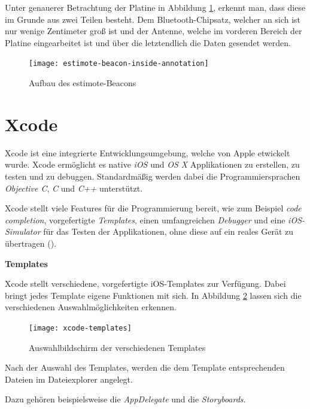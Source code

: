 Unter genauerer Betrachtung der Platine in Abbildung \ref{estimote-beacon-inside-annotations}, erkennt man, dass diese im Grunde aus zwei Teilen besteht.
Dem Bluetooth-Chipsatz, welcher an sich ist nur wenige Zentimeter groß ist und der Antenne, welche im vorderen Bereich der Platine eingearbeitet ist und über die letztendlich die Daten gesendet werden.

\begin{figure}[h!]
	\centering
	\texttt{[image: estimote-beacon-inside-annotation]}
	\caption{Aufbau des estimote-Beacons}
	\label{estimote-beacon-inside-annotations}
\end{figure}



\section{Xcode}
\label{sec:tools:xcode}
Xcode ist eine integrierte Entwicklungsumgebung, welche von Apple etwickelt wurde. Xcode ermöglicht es native \emph{iOS} und \emph{OS X} Applikationen zu erstellen, zu testen und zu debuggen.
Standardmäßig werden dabei die Programmiersprachen \emph{Objective C}, \emph{C} und \emph{C++} unterstützt.

Xcode stellt viele Features für die Programmierung bereit, wie zum Beispiel \emph{code completion}, vorgefertigte \emph{Templates}, einen umfangreichen \emph{Debugger} und eine \emph{iOS-Simulator} für das Testen der Applikationen, ohne diese auf ein reales Gerät zu übertragen (\citet{xcodeinfo}).


\textbf{Templates}

Xcode stellt verschiedene, vorgefertigte iOS-Templates zur Verfügung. 
Dabei bringt jedes Template eigene Funktionen mit sich. In Abbildung \ref{xcode-templates} lassen sich die verschiedenen Auswahlmöglichkeiten erkennen.

\begin{figure}[htb!]
		\centering
	\texttt{[image: xcode-templates]}
	\caption{Auswahlbildschirm der verschiedenen Templates}
	\label{xcode-templates}
\end{figure}

Nach der Auswahl des Templates, werden die dem Template entsprechenden Dateien im Dateiexplorer angelegt.


Dazu gehören beispielsweise die \emph{AppDelegate} und die \emph{Storyboards}.

